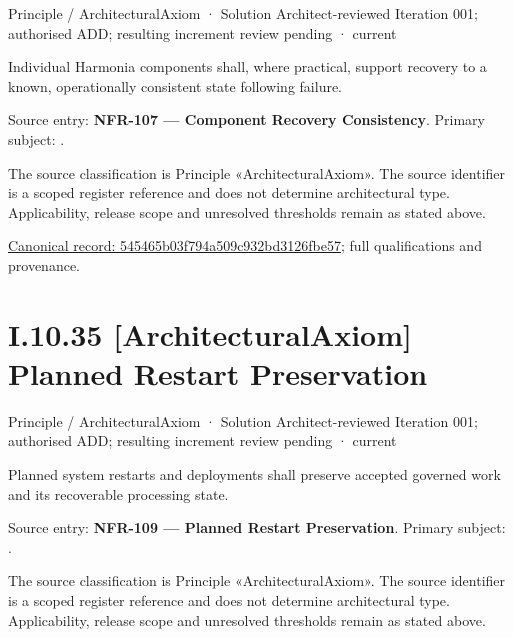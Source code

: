 \label{element:545465b03f794a509c932bd3126fbe57}
{\small Principle / ArchitecturalAxiom · Solution Architect-reviewed Iteration 001; authorised ADD; resulting increment review pending · current}\par

Individual Harmonia components shall, where practical, support recovery to a known, operationally consistent state following failure.



Source entry: \textbf{NFR-107 — Component Recovery Consistency}. Primary subject: \texttt{}.



The source classification is Principle «ArchitecturalAxiom». The source identifier is a scoped register reference and does not determine architectural type. Applicability, release scope and unresolved thresholds remain as stated above.


{\footnotesize \href{../../../../../../../../continuum/motivation/principle/architectural-axiom/545465b03f794a509c932bd3126fbe57.md}{Canonical record: 545465b03f794a509c932bd3126fbe57}; full qualifications and provenance.}\par
\section*{I.10.35 [ArchitecturalAxiom] Planned Restart Preservation}
\label{navigation:I.10.35}

\label{element:0ce24ee595a445e5b1a95e54aa9f1eac}
{\small Principle / ArchitecturalAxiom · Solution Architect-reviewed Iteration 001; authorised ADD; resulting increment review pending · current}\par

Planned system restarts and deployments shall preserve accepted governed work and its recoverable processing state.



Source entry: \textbf{NFR-109 — Planned Restart Preservation}. Primary subject: \texttt{}.



The source classification is Principle «ArchitecturalAxiom». The source identifier is a scoped register reference and does not determine architectural type. Applicability, release scope and unresolved thresholds remain as stated above.


